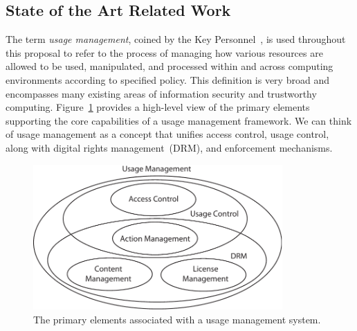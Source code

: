 \documentclass{sbir}
\begin{document}
\subsection{State of the Art Related Work}
The term \emph{usage management}, coined by the Key Personnel~\cite{JaHeLa:10}, is used throughout this proposal to refer to the process of managing how various resources are allowed to be used, manipulated, and processed within and across computing environments according to specified policy. This definition is very broad and encompasses many existing areas of information security and trustworthy computing. Figure~\ref{UM} provides a high-level view of the primary elements supporting the core capabilities of a usage management framework. We can think of usage management as a concept that unifies access control, usage control, along with digital rights management~(DRM), and enforcement mechanisms.
\begin{figure}[b]
  \centerline{\includegraphics[width=3.75in]{./images/usage_management.pdf}}
  \caption{The primary elements associated with a usage management system.}\label{UM}
\end{figure}
\end{document}
